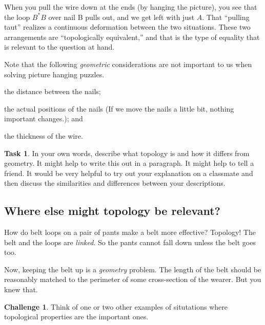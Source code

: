 \documentclass[12pt,letterpaper]{article}
\theoremstyle{definition}
\newtheorem*{challenge}{Challenge}
\newtheorem{task}{Task}
\begin{document}
When you pull the wire down at the ends (by hanging the picture), you see that the loop $B^*B$ over nail B pulls out, and we get left with just $A$.
That ``pulling taut'' realizes a continuous deformation between the two situations.
These two arrangements are ``topologically equivalent,'' and that is the type of equality that is relevant to the question at hand.

Note that the following \emph{geometric} considerations are not important to us when solving picture hanging puzzles.
\begin{compactenum}
\item the distance between the nails;
\item the actual positions of the nails (If we move the nails a little bit, nothing important changes.); and
\item the thickness of the wire.
\end{compactenum}

\begin{task}
In your own words, describe what topology is and how it differs from geometry.
It might help to write this out in a paragraph.
It might help to tell a friend.
It would be very helpful to try out your explanation on a classmate and then discuss the similarities and differences between your descriptions.
\end{task}

\subsection*{Where else might topology be relevant?}

How do belt loops on a pair of pants make a belt more effective?
Topology!
The belt and the loops are \emph{linked}.
So the pants cannot fall down unless the belt goes too.

Now, keeping the belt up is a \emph{geometry} problem.
The length of the belt should be reasonably matched to the perimeter of some cross-section of the wearer.
But you knew that.

\begin{challenge}
Think of one or two other examples of situtations where topological properties are the important ones.
\end{challenge}

\end{document}
